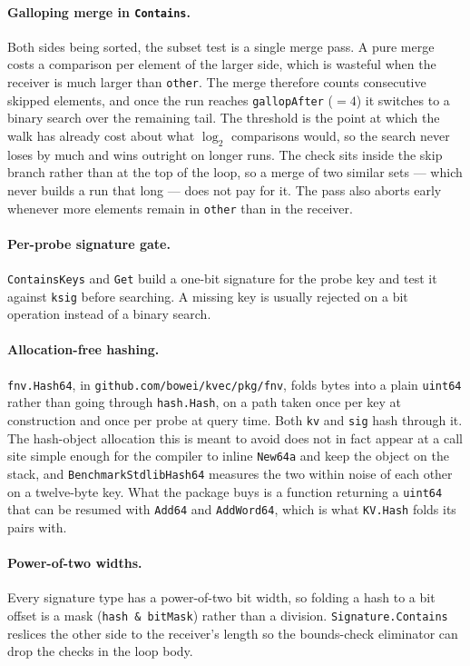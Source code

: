 \documentclass[11pt]{article}
\newcommand{\code}[1]{\texttt{#1}}
\begin{document}
\paragraph{Galloping merge in \code{Contains}.} Both sides being sorted, the
subset test is a single merge pass. A pure merge costs a comparison per element
of the larger side, which is wasteful when the receiver is much larger than
\code{other}. The merge therefore counts consecutive skipped elements, and once
the run reaches \code{gallopAfter} ($=4$) it switches to a binary search over
the remaining tail. The threshold is the point at which the walk has already
cost about what $\log_2$ comparisons would, so the search never loses by much
and wins outright on longer runs. The check sits inside the skip branch rather
than at the top of the loop, so a merge of two similar sets --- which never
builds a run that long --- does not pay for it. The pass also aborts early
whenever more elements remain in \code{other} than in the receiver.

\paragraph{Per-probe signature gate.} \code{ContainsKeys} and \code{Get} build a
one-bit signature for the probe key and test it against \code{ksig} before
searching. A missing key is usually rejected on a bit operation instead of a
binary search.

\paragraph{Allocation-free hashing.} \code{fnv.Hash64}, in
\code{github.com/bowei/kvec/pkg/fnv}, folds bytes into a plain \code{uint64}
rather than going through \code{hash.Hash}, on a path taken once per key at
construction and once per probe at query time. Both \code{kv} and \code{sig}
hash through it. The hash-object allocation this is meant to avoid does not in
fact appear at a call site simple enough for the compiler to inline
\code{New64a} and keep the object on the stack, and
\code{BenchmarkStdlibHash64} measures the two within noise of each other on a
twelve-byte key. What the package buys is a function returning a \code{uint64}
that can be resumed with \code{Add64} and \code{AddWord64}, which is what
\code{KV.Hash} folds its pairs with.

\paragraph{Power-of-two widths.} Every signature type has a power-of-two bit
width, so folding a hash to a bit offset is a mask (\code{hash \& bitMask})
rather than a division. \code{Signature.Contains} reslices the other side to the
receiver's length so the bounds-check eliminator can drop the checks in the
loop body.
\end{document}
